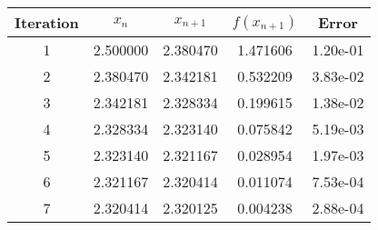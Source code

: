 \begin{tabular}{|c|c|c|c|c|}
\hline
Iteration & $x_n$ & $x_{n+1}$ & $f(x_{n+1})$ & Error \\
\hline
1 & 2.500000 & 2.380470 & 1.471606 & 1.20e-01 \\
\hline
2 & 2.380470 & 2.342181 & 0.532209 & 3.83e-02 \\
\hline
3 & 2.342181 & 2.328334 & 0.199615 & 1.38e-02 \\
\hline
4 & 2.328334 & 2.323140 & 0.075842 & 5.19e-03 \\
\hline
5 & 2.323140 & 2.321167 & 0.028954 & 1.97e-03 \\
\hline
6 & 2.321167 & 2.320414 & 0.011074 & 7.53e-04 \\
\hline
7 & 2.320414 & 2.320125 & 0.004238 & 2.88e-04 \\
\hline
\end{tabular}